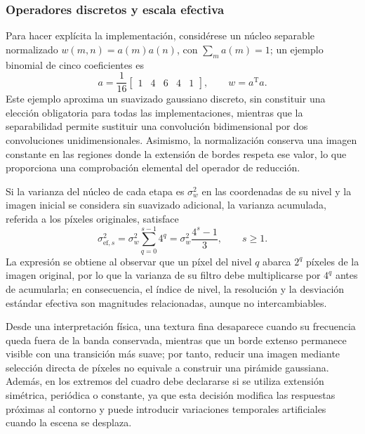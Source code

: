 \subsubsection{Operadores discretos y escala efectiva}

Para hacer explícita la implementación, considérese un núcleo separable normalizado $w(m,n)=a(m)a(n)$, con $\sum_m a(m)=1$; un ejemplo binomial de cinco coeficientes es
\begin{equation}
 a=\frac{1}{16}\begin{bmatrix}1&4&6&4&1\end{bmatrix},
 \qquad w=a^{\mathrm{T}}a.
 \label{eq:piramides_nucleo_binomial}
\end{equation}
Este ejemplo aproxima un suavizado gaussiano discreto, sin constituir una elección obligatoria para todas las implementaciones, mientras que la separabilidad permite sustituir una convolución bidimensional por dos convoluciones unidimensionales. Asimismo, la normalización conserva una imagen constante en las regiones donde la extensión de bordes respeta ese valor, lo que proporciona una comprobación elemental del operador de reducción.

Si la varianza del núcleo de cada etapa es $\sigma_w^2$ en las coordenadas de su nivel y la imagen inicial se considera sin suavizado adicional, la varianza acumulada, referida a los píxeles originales, satisface
\begin{equation}
 \sigma_{\mathrm{ef},s}^{2}
 =\sigma_w^2\sum_{q=0}^{s-1}4^q
 =\sigma_w^2\frac{4^s-1}{3},
 \qquad s\geq 1.
 \label{eq:piramides_sigma_efectiva}
\end{equation}
La expresión se obtiene al observar que un píxel del nivel $q$ abarca $2^q$ píxeles de la imagen original, por lo que la varianza de su filtro debe multiplicarse por $4^q$ antes de acumularla; en consecuencia, el índice de nivel, la resolución y la desviación estándar efectiva son magnitudes relacionadas, aunque no intercambiables.

Desde una interpretación física, una textura fina desaparece cuando su frecuencia queda fuera de la banda conservada, mientras que un borde extenso permanece visible con una transición más suave; por tanto, reducir una imagen mediante selección directa de píxeles no equivale a construir una pirámide gaussiana. Además, en los extremos del cuadro debe declararse si se utiliza extensión simétrica, periódica o constante, ya que esta decisión modifica las respuestas próximas al contorno y puede introducir variaciones temporales artificiales cuando la escena se desplaza.

